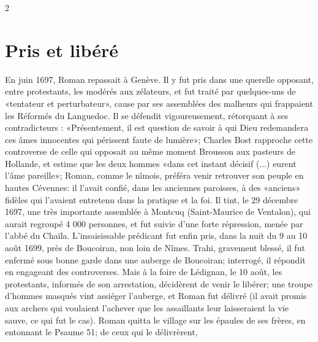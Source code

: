 {\begin{multicols}{2}
\section*{Pris et libéré}

En juin 1697, Roman repassait à Genève. Il y fut pris dans une querelle opposant, entre protestants, les modérés aux zélateurs, et fut traité par quelques-uns de «tentateur et perturbateur», cause par ses assemblées des malheurs qui frappaient les Réformés du Languedoc. Il se défendit vigoureusement, rétorquant à ses contradicteurs : «Présentement, il est question de savoir à qui Dieu redemandera ces âmes innocentes qui périssent faute de lumière»; Charles Bost rapproche cette controverse de celle qui opposait au même moment Brousson aux pasteurs de Hollande, et estime que les deux hommes «dans cet instant décisif (...) eurent l’âme pareille»; Roman, comme le nîmois, préféra venir retrouver son peuple en hautes Cévennes: il l’avait confié, dans les anciennes paroisses, à des «anciens» fidèles qui l’avaient entretenu dans la pratique et la foi. Il tint, le 29 décembre 1697, une très importante assemblée à Montcuq (Saint-Maurice de Ventalon), qui aurait regroupé 4 000 personnes, et fut suivie d’une forte répression, menée par l’abbé du Chaïla. L’insaisissable prédicant fut enfin pris, dans la nuit du 9 au 10 août 1699, près de Boucoiran, non loin de Nîmes. Trahi, gravement blessé, il fut enfermé sous bonne garde dans une auberge de Boucoiran; interrogé, il répondit en engageant des controverses. Mais à la foire de Lédignan, le 10 août, les protestants, informés de son arrestation, décidèrent de venir le libérer; une troupe d’hommes masqués vint assiéger l’auberge, et Roman fut délivré (il avait promis aux archers qui voulaient l’achever que les assaillants leur laisseraient la vie sauve, ce qui fut le cas). Roman quitta le village sur les épaules de ses frères, en entonnant le Psaume 51; de ceux qui le délivrèrent,

\end{multicols}
}


